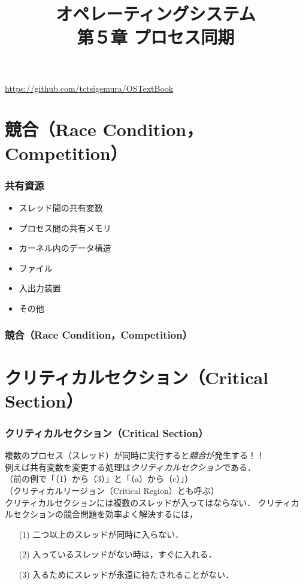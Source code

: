 \documentclass[unicode,handout]{beamer}                   %
\begin{document}
\title[プロセス同期]
      {オペレーティングシステム\\第５章 プロセス同期}
\date{}
\begin{frame}
  \titlepage
  \centerline{\url{https://github.com/tctsigemura/OSTextBook}}
\end{frame}


\section{競合（Race Condition，Competition）}
\begin{frame}
  \frametitle{共有資源}
  \begin{itemize}
    \item スレッド間の共有変数
    \item プロセス間の共有メモリ
    \item カーネル内のデータ構造
    \item ファイル
    \item 入出力装置
    \item その他
  \end{itemize}
\end{frame}

\begin{frame}
  \frametitle{競合（Race Condition，Competition）}
\end{frame}

\section{クリティカルセクション（Critical Section）}
\begin{frame}
  \frametitle{クリティカルセクション（Critical Section）}
  複数のプロセス（スレッド）が同時に実行すると\emph{競合}が発生する！！\\
  例えば共有変数を変更する処理は\emph{クリティカルセクション}である．\\
  （前の例で「（1）から（3）」と「（a）から（c）」）\\
  （クリティカルリージョン（Critical Region）とも呼ぶ）\\
  クリティカルセクションには複数のスレッドが入ってはならない．
  \vfill
  クリティカルセクションの競合問題を効率よく解決するには，
  \begin{enumerate}
  \item[(1)] 二つ以上のスレッドが同時に入らない．
  \item[(2)] 入っているスレッドがない時は，すぐに入れる．
  \item[(3)] 入るためにスレッドが永遠に待たされることがない．
  \end{enumerate}
  \vfill
\end{frame}
\end{document}

